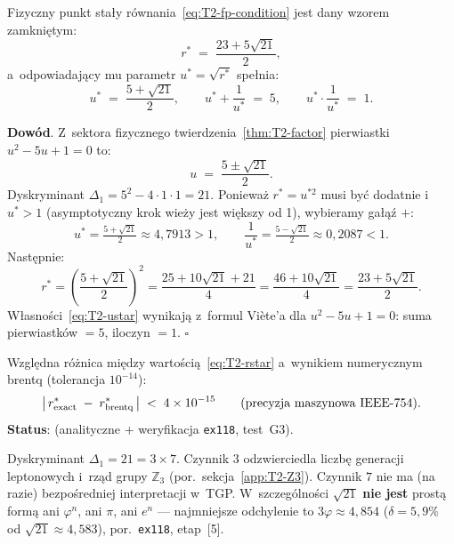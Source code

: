 \begin{theorem}\label{thm:T2-rstar}
Fizyczny punkt sta\l{}y r\'ownania~\eqref{eq:T2-fp-condition}
jest dany wzorem zamkni\k{e}tym:
\begin{equation}\label{eq:T2-rstar}
  r^* \;=\; \frac{23 + 5\sqrt{21}}{2},
\end{equation}
a~odpowiadaj\k{a}cy mu parametr $u^* = \sqrt{r^*}$ spe\l{}nia:
\begin{equation}\label{eq:T2-ustar}
  u^* \;=\; \frac{5 + \sqrt{21}}{2},
  \qquad
  u^* + \frac{1}{u^*} \;=\; 5,
  \qquad
  u^* \cdot \frac{1}{u^*} \;=\; 1.
\end{equation}

\textbf{Dow\'od}.
Z~sektora fizycznego twierdzenia~\ref{thm:T2-factor} pierwiastki
$u^2-5u+1=0$ to:
\[
  u \;=\; \frac{5 \pm \sqrt{21}}{2}.
\]
Dyskryminant $\Delta_1 = 5^2 - 4 \cdot 1 \cdot 1 = 21$.
Poniewa\.z $r^* = u^{*2}$ musi by\'c dodatnie i~$u^* > 1$ (asymptotyczny
krok wie\.zy jest wi\k{e}kszy od 1), wybieramy ga\l{}\k{a}\'z $+$:
\[
  u^* = \tfrac{5+\sqrt{21}}{2} \approx 4{,}7913 > 1,
  \qquad
  \frac{1}{u^*} = \tfrac{5-\sqrt{21}}{2} \approx 0{,}2087 < 1.
\]
Nast\k{e}pnie:
\[
  r^* = \left(\frac{5+\sqrt{21}}{2}\right)^{\!2}
      = \frac{25 + 10\sqrt{21} + 21}{4}
      = \frac{46 + 10\sqrt{21}}{4}
      = \frac{23 + 5\sqrt{21}}{2}.
\]
W\l{}asno\'sci~\eqref{eq:T2-ustar} wynikaj\k{a} z~formul
Viète'a dla $u^2-5u+1=0$:
suma pierwiastk\'ow $= 5$, iloczyn $= 1$.
\hfill$\square$
\end{theorem}

\begin{corollary}\label{cor:T2-precision}
Wzgl\k{e}dna ró\.znica mi\k{e}dzy warto\'sci\k{a}~\eqref{eq:T2-rstar}
a~wynikiem numerycznym brentq (tolerancja $10^{-14}$):
\begin{equation}
  \left|\,r^*_{\rm exact} \;-\; r^*_{\rm brentq}\,\right|
  \;<\; 4 \times 10^{-15}
  \qquad\text{(precyzja maszynowa IEEE-754)}.
\end{equation}
\textbf{Status}: 
(analityczne + weryfikacja \texttt{ex118}, test~G3).
\end{corollary}

\begin{remark}\label{rem:T2-21}
Dyskryminant $\Delta_1 = 21 = 3 \times 7$.
Czynnik $3$ odzwierciedla liczb\k{e} generacji leptonowych
i~rz\k{a}d grupy $\mathbb{Z}_3$ (por.\ sekcja~\ref{app:T2-Z3}).
Czynnik $7$ nie ma (na razie) bezpo\'sredniej interpretacji w~TGP.
W~szczeg\'olno\'sci $\sqrt{21}$ \textbf{nie jest} prost\k{a} form\k{a}
ani $\varphi^n$, ani $\pi$, ani $e^n$ ---
najmniejsze odchylenie to $3\varphi \approx 4{,}854$ ($\delta = 5{,}9\%$
od $\sqrt{21} \approx 4{,}583$), por.\ \texttt{ex118}, etap~[5].
\end{remark}


